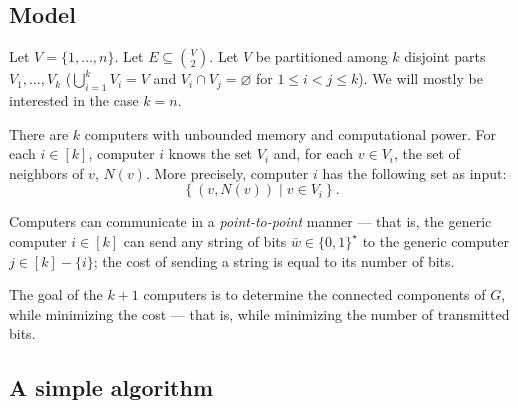 \subsection{Model}

Let $V = \{1,\ldots, n\}$. Let $E \subseteq \binom V 2$. Let $V$ be partitioned among $k$ disjoint parts $V_1, \ldots, V_k$ ($\bigcup_{i=1}^k V_i = V$ and $V_i \cap V_j = \varnothing$ for $1 \le i <  j \le k$). We will mostly be interested in the case $k = n$.

\smallskip

There are $k$ computers with unbounded memory and computational power. For each $i \in [k]$, computer $i$ knows the set $V_i$ and, for each $v \in V_i$, the set of neighbors of $v$, $N(v)$. More precisely, computer $i$ has the following set as input: $$\left\{(v, N(v)) \mid v \in V_i\right\}.$$

Computers can communicate in a {\em point-to-point} manner --- that is, the generic computer $i \in [k]$ can send any string of bits $\bar{w} \in \{0,1\}^{\star}$ to the generic computer $j \in [k] - \{i\}$; the cost of sending a string is equal to its number of bits.

\smallskip

The goal of the $k+1$ computers is to determine the  connected components of $G$, while minimizing the cost --- that is, while minimizing the number of transmitted bits. 

\subsection{A simple algorithm}

